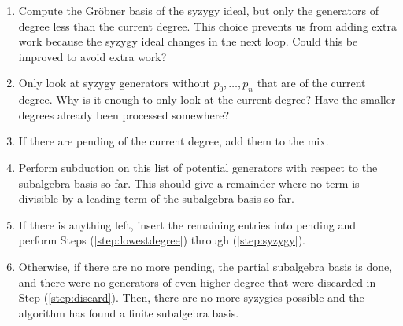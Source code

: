 \documentclass[11pt]{amsart}
\newcommand{\alert}[1]{{\color{red}#1}}
\begin{document}
\begin{enumerate}
\begin{enumerate}
\item Compute the Gr\"obner basis of the syzygy ideal, but only the generators of degree less than the current degree.  This choice prevents us from adding extra work because the syzygy ideal changes in the next loop.  \alert{Could this be improved to avoid extra work?}
\item Only look at syzygy generators without $p_0,\dots,p_n$ that are of the current degree.  \alert{Why is it enough to only look at the current degree?  Have the smaller degrees already been processed somewhere?}
\item If there are pending of the current degree, add them to the mix.
\item Perform subduction on this list of potential generators with respect to the subalgebra basis so far.  \alert{This should give a remainder where no term is divisible by a leading term of the subalgebra basis so far.}
\item If there is anything left, insert the remaining entries into pending and perform Steps (\ref{step:lowestdegree}) through (\ref{step:syzygy}).
\item Otherwise, if there are no more pending, the partial subalgebra basis is done, and there were no generators of even higher degree that were discarded in Step (\ref{step:discard}).  Then, there are no more syzygies possible and the algorithm has found a finite subalgebra basis.
\end{enumerate}
\end{enumerate}
\end{document}
